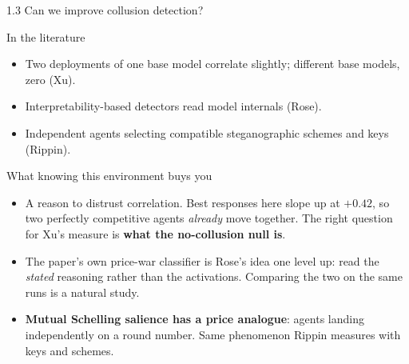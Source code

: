 \documentclass[aspectratio=169,9pt]{beamer}
\newcommand{\orange}[1]{\textcolor{AmazonOrange}{\textbf{#1}}}
\newcommand{\blue}[1]{\textcolor{densityblue}{\textbf{#1}}}
\begin{document}
\begin{frame}{1.3 Can we improve collusion detection?}
\begin{block}{In the literature}
\begin{itemize}
    \item Two deployments of one base model correlate slightly; different base models, zero (Xu).
    \item Interpretability-based detectors read model internals (Rose).
    \item Independent agents selecting compatible steganographic schemes and keys (Rippin).
\end{itemize}
\end{block}
\pause
\vspace{0.1cm}
\begin{block}{What knowing this environment buys you}
\begin{itemize}
    \item A reason to distrust correlation. Best responses here slope up at $+0.42$, so two perfectly
    competitive agents \textit{already} move together. The right question for Xu's measure is
    \orange{what the no-collusion null is}.
    \item The paper's own price-war classifier is Rose's idea one level up: read the \textit{stated} reasoning
    rather than the activations. Comparing the two on the same runs is a natural study.
    \item \blue{Mutual Schelling salience has a price analogue}: agents landing independently on a round number.
    Same phenomenon Rippin measures with keys and schemes.
\end{itemize}
\end{block}
\end{frame}
\end{document}
